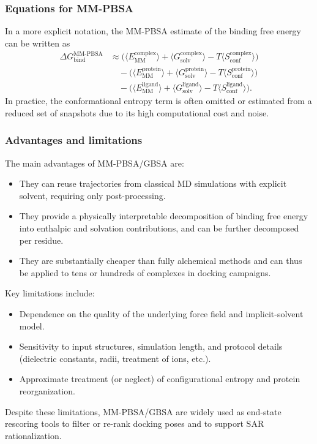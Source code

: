 \documentclass[12pt]{article}
\begin{document}
\subsubsection{Equations for MM-PBSA}

In a more explicit notation, the MM-PBSA estimate of the binding free energy can be written as
\begin{align*}
\Delta G_\mathrm{bind}^{\mathrm{MM\mbox{-}PBSA}} 
&\approx 
\big( \langle E_\mathrm{MM}^\mathrm{complex} \rangle 
+ \langle G_\mathrm{solv}^\mathrm{complex} \rangle 
- T \langle S_\mathrm{conf}^\mathrm{complex} \rangle \big) \\
&\quad - 
\big( \langle E_\mathrm{MM}^\mathrm{protein} \rangle 
+ \langle G_\mathrm{solv}^\mathrm{protein} \rangle 
- T \langle S_\mathrm{conf}^\mathrm{protein} \rangle \big) \\
&\quad - 
\big( \langle E_\mathrm{MM}^\mathrm{ligand} \rangle 
+ \langle G_\mathrm{solv}^\mathrm{ligand} \rangle 
- T \langle S_\mathrm{conf}^\mathrm{ligand} \rangle \big).
\end{align*}
In practice, the conformational entropy term is often omitted or estimated from a reduced set of snapshots due to its high computational cost and noise. 

\subsubsection{Advantages and limitations}

The main advantages of MM-PBSA/GBSA are:
\begin{itemize}
  \item They can reuse trajectories from classical MD simulations with explicit solvent, requiring only post-processing.
  \item They provide a physically interpretable decomposition of binding free energy into enthalpic and solvation contributions, and can be further decomposed per residue.
  \item They are substantially cheaper than fully alchemical methods and can thus be applied to tens or hundreds of complexes in docking campaigns.\cite{CH10_homeyer2012mmpbsa} 
\end{itemize}

Key limitations include:
\begin{itemize}
  \item Dependence on the quality of the underlying force field and implicit-solvent model.
  \item Sensitivity to input structures, simulation length, and protocol details (dielectric constants, radii, treatment of ions, etc.).
  \item Approximate treatment (or neglect) of configurational entropy and protein reorganization.
\end{itemize}
Despite these limitations, MM-PBSA/GBSA are widely used as end-state rescoring tools to filter or re-rank docking poses and to support SAR rationalization. 
\end{document}
